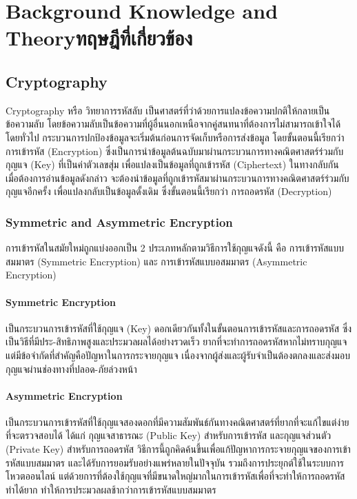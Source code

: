 \chapter{\ifenglish Background Knowledge and Theory\else ทฤษฎีที่เกี่ยวข้อง\fi}

\section{Cryptography}
Cryptography หรือ วิทยาการรหัสลับ เป็นศาสตร์ที่ว่าด้วยการแปลงข้อความปกติให้กลายเป็นข้อความลับ โดยข้อความลับเป็นข้อความที่ผู้อื่นนอกเหนือจากคู่สนทนาที่ต้องการไม่สามารถเข้าใจได้
โดยทั่วไป กระบวนการปกป้องข้อมูลจะเริ่มต้นก่อนการจัดเก็บหรือการส่งข้อมูล โดยขั้นตอนนี้เรียกว่า การเข้ารหัส (Encryption) 
ซึ่งเป็นการนำข้อมูลต้นฉบับมาผ่านกระบวนการทางคณิตศาสตร์ร่วมกับกุญแจ (Key) ที่เป็นค่าตัวเลขสุ่ม 
เพื่อแปลงเป็นข้อมูลที่ถูกเข้ารหัส (Ciphertext) ในทางกลับกัน เมื่อต้องการอ่านข้อมูลดังกล่าว 
จะต้องนำข้อมูลที่ถูกเข้ารหัสมาผ่านกระบวนการทางคณิตศาสตร์ร่วมกับกุญแจอีกครั้ง เพื่อแปลงกลับเป็นข้อมูลดั้งเดิม 
ซึ่งขั้นตอนนี้เรียกว่า การถอดรหัส (Decryption)

\subsection{Symmetric and Asymmetric Encryption}
การเข้ารหัสในสมัยใหม่ถูกแบ่งออกเป็น 2 ประเภทหลักตามวิธีการใช้กุญแจดังนี้ คือ การเข้ารหัสแบบสมมาตร (Symmetric Encryption) และ การเข้ารหัสแบบอสมมาตร (Asymmetric Encryption)

\subsubsection{Symmetric Encryption}
เป็นกระบวนการเข้ารหัสที่ใช้กุญแจ (Key) ดอกเดียวกันทั้งในขั้นตอนการเข้ารหัสและการถอดรหัส ซึ่งเป็นวิธีที่มีประ-สิทธิภาพสูงและประมวลผลได้อย่างรวดเร็ว ยากที่จะทำการถอดรหัสหากไม่ทราบกุญแจ 
แต่มีข้อจำกัดที่สำคัญคือปัญหาในการกระจายกุญแจ 
เนื่องจากผู้ส่งและผู้รับจำเป็นต้องตกลงและส่งมอบกุญแจผ่านช่องทางที่ปลอด-ภัยล่วงหน้า

\subsubsection{Asymmetric Encryption}
เป็นกระบวนการเข้ารหัสที่ใช้กุญแจสองดอกที่มีความสัมพันธ์กันทางคณิตศาสตร์ที่ยากที่จะแก้ไขแต่ง่ายที่จะตรวจสอบได้
ได้แก่ กุญแจสาธารณะ (Public Key) สำหรับการเข้ารหัส และกุญแจส่วนตัว (Private Key) สำหรับการถอดรหัส 
วิธีการนี้ถูกคิดค้นขึ้นเพื่อแก้ปัญหาการกระจายกุญแจของการเข้ารหัสแบบสมมาตร 
และได้รับการยอมรับอย่างแพร่หลายในปัจจุบัน รวมถึงการประยุกต์ใช้ในระบบการโหวตออนไลน์
แต่ด้วยการที่ต้องใช้กุญแจที่มีขนาดใหญ่มากในการเข้ารหัสเพื่อที่จะทำให้การถอดรหัสทำได้ยาก
ทำให้การประมวลผลช้ากว่าการเข้ารหัสแบบสมมาตร


